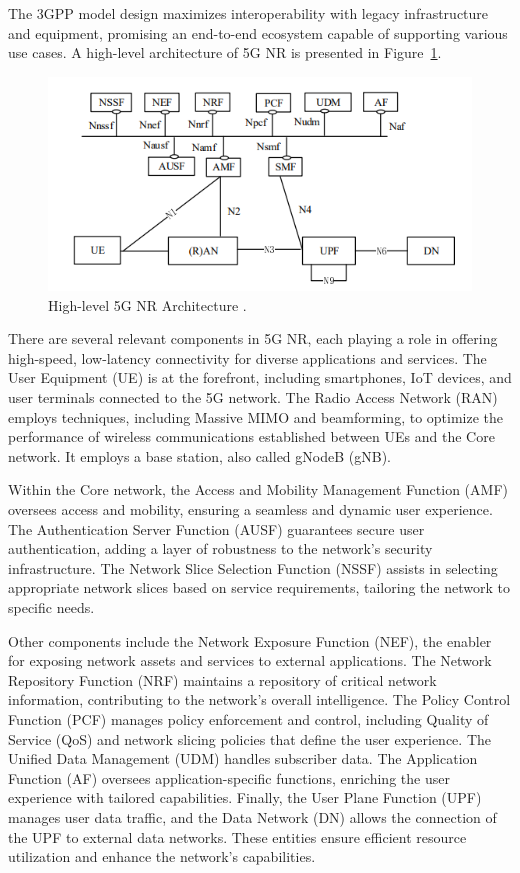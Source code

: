 The 3GPP model design maximizes interoperability with legacy infrastructure and equipment, promising an end-to-end ecosystem capable of supporting various use cases.
A high-level architecture of 5G NR is presented in Figure~\ref{fig:5G_arch}.

\begin{figure}[H]
    \centering
    \includegraphics[width=0.7\linewidth]{figures/5g NR}
    \caption[High-level 5G NR Architecture]{High-level 5G NR Architecture \cite{ETSI_5G_NR}.}
    \label{fig:5G_arch}
\end{figure}

There are several relevant components in 5G NR, each playing a role in offering high-speed, low-latency connectivity for diverse applications and services.
The User Equipment (UE) is at the forefront, including smartphones, IoT devices, and user terminals connected to the 5G network.
The Radio Access Network (RAN) employs techniques, including Massive MIMO and beamforming, to optimize the performance of wireless communications established between UEs and the Core network.
It employs a base station, also called gNodeB (gNB).

Within the Core network, the Access and Mobility Management Function (AMF) oversees access and mobility, ensuring a seamless and dynamic user experience.
The Authentication Server Function (AUSF) guarantees secure user authentication, adding a layer of robustness to the network's security infrastructure.
The Network Slice Selection Function (NSSF) assists in selecting appropriate network slices based on service requirements, tailoring the network to specific needs.

Other components include the Network Exposure Function (NEF), the enabler for exposing network assets and services to external applications.
The Network Repository Function (NRF) maintains a repository of critical network information, contributing to the network's overall intelligence.
The Policy Control Function (PCF) manages policy enforcement and control, including Quality of Service (QoS) and network slicing policies that define the user experience.
The Unified Data Management (UDM) handles subscriber data.
The Application Function (AF) oversees application-specific functions, enriching the user experience with tailored capabilities.
Finally, the User Plane Function (UPF) manages user data traffic, and the Data Network (DN) allows the connection of the UPF to external data networks.
These entities ensure efficient resource utilization and enhance the network's capabilities.

